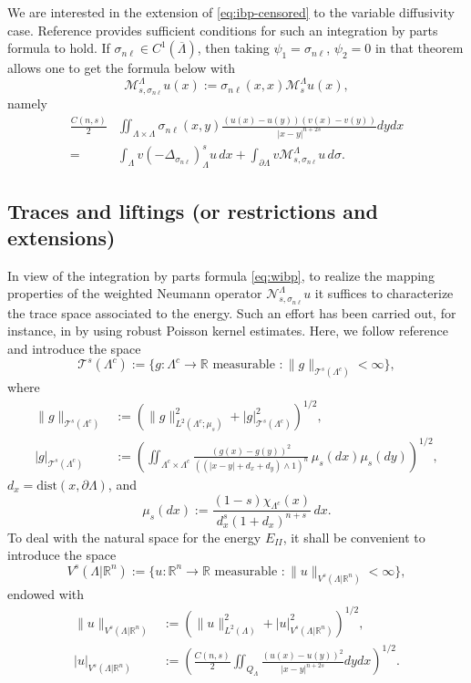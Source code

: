 \documentclass{amsart}
\newcommand{\domain}{\Lambda}
\newcommand{\snl}{{\sigma_{n\ell}}}
\def\calT{\mathcal{T}}
\def\R{{\mathbb R}}
\newcommand{\Ms}{\mathcal{M}_s}
\newcommand{\Msnl}{\mathcal{M}_{s,\snl}}
\newcommand{\Nsnl}{\mathcal{N}_{s,\snl}}
\theoremstyle{plain}
\numberwithin{equation}{section}
\numberwithin{table}{section}
\numberwithin{figure}{section}
\numberwithin{theorem}{section}
\numberwithin{corollary}{section}
\numberwithin{definition}{section}
\numberwithin{lemma}{section}
\numberwithin{proposition}{section}
\numberwithin{remark}{section}
\begin{document}
We are interested in the extension of \eqref{eq:ibp-censored} to the variable diffusivity case. Reference \cite[Theorem 4.5]{Guan} provides sufficient conditions for such an integration by parts formula to hold. If $\snl \in C^1(\overline\domain)$, then taking $\psi_1 = \snl$, $\psi_2 = 0$ in that theorem allows one to get the formula below with
\[
\Msnl^{\domain} u (x) := \snl(x,x) \Ms^{\domain} u (x),
\]
namely
\begin{equation} \label{eq:ibp-censored-with-sigma}
\begin{split}
\frac{C(n,s)}{2} & \iint_{\domain\times\domain} \snl(x,y) \frac{(u(x)-u(y))(v(x)-v(y))}{|x-y|^{n+2s}} dy dx  \\ 
= & \int_{\domain} v (-\Delta_\snl)^s_{\domain} u \,dx+ \int_{\partial{\domain}} v \Msnl^{\domain} u \,d\sigma. 
\end{split}
\end{equation}

\subsection{Traces and liftings (or restrictions and extensions)} \label{sec:traces-liftings}
In view of the integration by parts formula \eqref{eq:wibp}, to realize the mapping properties of the weighted Neumann operator $\Nsnl^\domain u$ it suffices to characterize the trace space associated to the energy. Such an effort has been carried out, for instance, in \cite{Bogdan,GrHe22} by using robust Poisson kernel estimates. Here, we follow reference \cite{GrKa23} and introduce the space
\begin{equation}\label{eq:def-trace-space}
\calT^s(\domain^c) := \{ g \colon \domain^c \to \R \mbox{ measurable } \colon \| g \|_{\calT^s(\domain^c)} < \infty \},
\end{equation}
where
\[ \begin{aligned}
\| g \|_{\calT^s(\domain^c)} & := \left( \| g \|_{L^2(\domain^c; \mu_s)}^2 + | g |_{\calT^s(\domain^c)}^2\right)^{1/2} , \\
| g |_{\calT^s(\domain^c)} & := \left(\iint_{\domain^c \times \domain^c} \frac{(g(x) - g(y))^2}{((|x-y| + d_x + d_y ) \wedge 1)^n} \, \mu_s(dx) \mu_s(dy)\right)^{1/2},
\end{aligned} \]
$d_x = \mbox{dist}(x, \partial \domain)$, and
\[
\mu_s(dx) := \frac{(1-s) \chi_{\domain^c}(x)}{d_x^s (1+d_x)^{n+s}} \,  dx.
\]
To deal with the natural space for the  energy $E_{II}$, it shall be convenient to introduce the space
\[
V^s(\domain | \R^n) := \{ u \colon \R^n \to \R \mbox{ measurable } \colon \| u \|_{V^s(\domain | \R^n)} < \infty \},
\]
endowed with 
\begin{equation} \label{eq:def-Vs-norm} \begin{aligned}
\| u \|_{V^s(\domain | \R^n)} & := (\| u \|_{L^2(\domain)}^2 + |u|_{V^s(\domain | \R^n)}^2)^{1/2}, \\
 |u|_{V^s(\domain | \R^n)}& := \left(\frac{C(n,s)}{2} \iint_{Q_\domain}\frac{(u(x)-u(y))^2}{|x-y|^{n+2s}} dy dx\right)^{1/2}.
\end{aligned} \end{equation}
\end{document}
